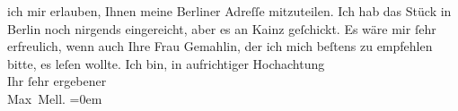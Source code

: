 \begin{ledgroupsized}[t]{13cm}
               ich mir erlauben, Ihnen meine Berliner Adreſſe
               mitzuteilen. Ich hab das Stück
               in Berlin noch nirgends eingereicht, aber es an
                  Kainz geſchickt.\pend
           \pstart
           Es wäre mir ſehr erfreulich, wenn auch Ihre Frau Gemahlin, der ich mich beſtens zu empfehlen bitte, es leſen
               wollte.\pend
           \pstart
           Ich bin, in aufrichtiger Hochachtung{\\[\baselineskip]}Ihr ſehr ergebener{\\[\baselineskip]}\spacefill\mbox{Max Mell.}\pend
           \leftskip=0em{}
         
         \endnumbering{}\end{ledgroupsized}  \newcommand{\dateiname}{L01631}\newcommand{\titel}{Max Mell an Arthur Schnitzler, 11. 10. 1906}\newcommand{\editorInnen}{Martin Anton Müller und Gerd-Hermann Susen}
      